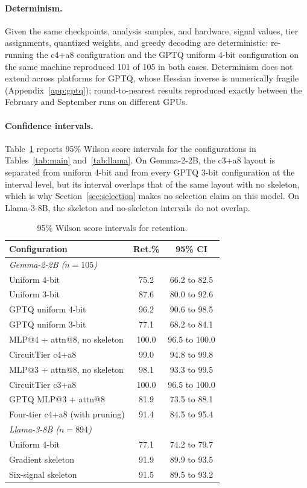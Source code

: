 \documentclass[11pt]{article}
\begin{document}
\paragraph{Determinism.}
Given the same checkpoints, analysis samples, and hardware, 
signal values, tier assignments, quantized weights, and greedy 
decoding are deterministic: re-running the c4+a8 configuration 
and the GPTQ uniform 4-bit configuration on the same machine 
reproduced 101 of 105 in both cases. Determinism does not 
extend across platforms for GPTQ, whose Hessian inverse is 
numerically fragile (Appendix~\ref{app:gptq}); round-to-nearest 
results reproduced exactly between the February and September 
runs on different GPUs.

\paragraph{Confidence intervals.}
\label{app:ci}
Table~\ref{tab:ci} reports 95\% Wilson score intervals for the 
configurations in Tables~\ref{tab:main} and~\ref{tab:llama}. On 
Gemma-2-2B, the c3+a8 layout is separated from uniform 4-bit 
and from every GPTQ 3-bit configuration at the interval level, 
but its interval overlaps that of the same layout with no 
skeleton, which is why Section~\ref{sec:selection} makes no 
selection claim on this model. On Llama-3-8B, the skeleton and 
no-skeleton intervals do not overlap.

\begin{table}[t]
\centering
\small
\begin{tabular}{lcc}
\toprule
\textbf{Configuration} & \textbf{Ret.\%} & \textbf{95\% CI} \\
\midrule
\multicolumn{3}{l}{\textit{Gemma-2-2B ($n{=}105$)}} \\
Uniform 4-bit & 75.2 & 66.2 to 82.5 \\
Uniform 3-bit & 87.6 & 80.0 to 92.6 \\
GPTQ uniform 4-bit & 96.2 & 90.6 to 98.5 \\
GPTQ uniform 3-bit & 77.1 & 68.2 to 84.1 \\
MLP@4 + attn@8, no skeleton & 100.0 & 96.5 to 100.0 \\
CircuitTier c4+a8 & 99.0 & 94.8 to 99.8 \\
MLP@3 + attn@8, no skeleton & 98.1 & 93.3 to 99.5 \\
CircuitTier c3+a8 & 100.0 & 96.5 to 100.0 \\
GPTQ MLP@3 + attn@8 & 81.9 & 73.5 to 88.1 \\
Four-tier c4+a8 (with pruning) & 91.4 & 84.5 to 95.4 \\
\midrule
\multicolumn{3}{l}{\textit{Llama-3-8B ($n{=}894$)}} \\
Uniform 4-bit & 77.1 & 74.2 to 79.7 \\
Gradient skeleton & 91.9 & 89.9 to 93.5 \\
Six-signal skeleton & 91.5 & 89.5 to 93.2 \\
\bottomrule
\end{tabular}
\caption{95\% Wilson score intervals for retention.}
\label{tab:ci}
\end{table}
\end{document}
